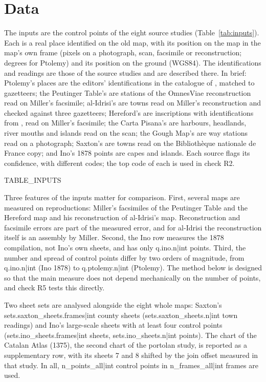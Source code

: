 \documentclass[11pt,a4paper]{article}
\begin{document}
\section{Data}\label{sec:data}
The inputs are the control points of the eight source studies (Table~\ref{tab:inputs}). Each is a real place identified on the old map, with its position on the map in the map's own frame (pixels on a photograph, scan, facsimile or reconstruction; degrees for Ptolemy) and its position on the ground (WGS84). The identifications and readings are those of the source studies and are described there. In brief: Ptolemy's places are the editors' identifications in the catalogue of \citet{grasshoff2019}, matched to gazetteers; the Peutinger Table's are stations of the OmnesViae reconstruction read on Miller's facsimile; al-Idrisi's are towns read on Miller's reconstruction and checked against three gazetteers; Hereford's are inscriptions with identifications from \citet{bevan1873}, read on Miller's facsimile; the Carta Pisana's are harbours, headlands, river mouths and islands read on the scan; the Gough Map's are way stations read on a photograph; Saxton's are towns read on the Biblioth\`eque nationale de France copy; and Ino's 1878 points are capes and islands. Each source flags its confidence, with different codes; the top code of each is used in check R2.

{{TABLE_INPUTS}}

Three features of the inputs matter for comparison. First, several maps are measured on reproductions: Miller's facsimiles of the Peutinger Table and the Hereford map and his reconstruction of al-Idrisi's map. Reconstruction and facsimile errors are part of the measured error, and for al-Idrisi the reconstruction itself is an assembly by Miller. Second, the Ino row measures the 1878 compilation, not Ino's own sheets, and has only {{q.ino.n|int}} points. Third, the number and spread of control points differ by two orders of magnitude, from {{q.ino.n|int}} (Ino 1878) to {{q.ptolemy.n|int}} (Ptolemy). The method below is designed so that the main measure does not depend mechanically on the number of points, and check R5 tests this directly.

Two sheet sets are analysed alongside the eight whole maps: Saxton's {{sets.saxton_sheets.frames|int}} county sheets ({{sets.saxton_sheets.n|int}} town readings) and Ino's large-scale sheets with at least four control points ({{sets.ino_sheets.frames|int}} sheets, {{sets.ino_sheets.n|int}} points). The chart of the Catalan Atlas (1375), the second chart of the portolan study, is reported as a supplementary row, with its sheets 7 and 8 shifted by the join offset measured in that study. In all, {{n_points_all|int}} control points in {{n_frames_all|int}} frames are used.
\end{document}

